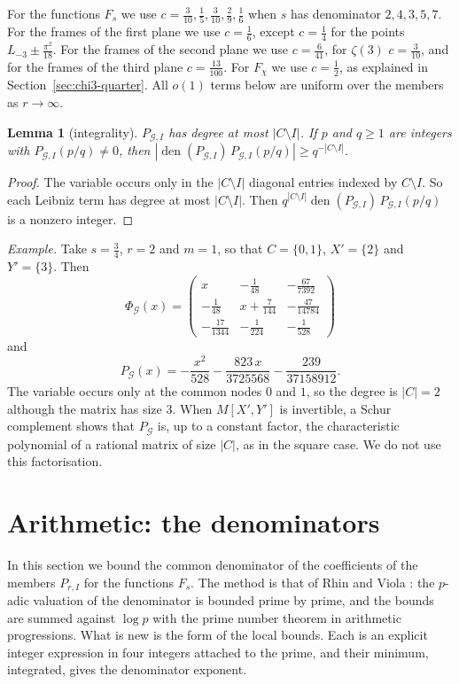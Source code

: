 \documentclass[11pt]{amsart}
\newtheorem{lemma}[theorem]{Lemma}
\theoremstyle{definition}
\theoremstyle{remark}
\numberwithin{equation}{section}
\newcommand{\den}{\operatorname{den}}
\newcommand{\Lt}{L_{-3}}             %
\begin{document}
For the functions $F_s$ we use $c=\frac3{10},\frac15,\frac3{10},\frac29,\frac16$ when $s$ has denominator
$2,4,3,5,7$. For the frames of the first plane we use $c=\frac16$, except $c=\frac14$ for the points
$\Lt\pm\frac{\pi^2}{18}$. For the frames of the second plane we use $c=\frac6{41}$, for $\zeta(3)$ $c=\frac3{10}$, and for
the frames of the third plane $c=\frac{13}{100}$. For $F_\chi$ we use
$c=\frac12$, as explained in Section~\ref{sec:chi3-quarter}. All $o(1)$ terms below are uniform over the members as
$r\to\infty$.

\begin{lemma}[integrality]\label{lem:integrality}
$P_{\mathcal G,I}$ has degree at most $|C\setminus I|$. If $p$ and $q\ge1$ are integers with
$P_{\mathcal G,I}(p/q)\ne0$, then $|\den(P_{\mathcal G,I})\,P_{\mathcal G,I}(p/q)|\ge q^{-|C\setminus I|}$.
\end{lemma}
\begin{proof}
The variable occurs only in the $|C\setminus I|$ diagonal entries indexed by $C\setminus I$. So each Leibniz term has
degree at most $|C\setminus I|$. Then $q^{|C\setminus I|}\den(P_{\mathcal G,I})\,P_{\mathcal G,I}(p/q)$ is a nonzero
integer.
\end{proof}

\emph{Example.} Take $s=\frac34$, $r=2$ and $m=1$, so that $C=\{0,1\}$, $X'=\{2\}$ and $Y'=\{3\}$. Then
\[
 \Phi_{\mathcal G}(x)=\begin{pmatrix}
 x & -\frac1{48} & -\frac{67}{7392}\\[2pt]
 -\frac1{48} & x+\frac7{144} & -\frac{47}{14784}\\[2pt]
 -\frac{17}{1344} & -\frac1{224} & -\frac1{528}
 \end{pmatrix}
\]
and
\[
 P_{\mathcal G}(x)=-\frac{x^2}{528}-\frac{823\,x}{3725568}-\frac{239}{37158912}.
\]
The variable occurs only at the common nodes $0$ and $1$, so the degree is $|C|=2$ although the matrix has size $3$. When $M[X',Y']$ is invertible, a Schur complement shows that $P_{\mathcal G}$
is, up to a constant factor, the characteristic polynomial of a rational matrix of size $|C|$, as in the square case.
We do not use this factorisation.

\section{Arithmetic: the denominators}\label{sec:content}

In this section we bound the common denominator of the coefficients of the members $P_{r,I}$ for the functions $F_s$.
The method is that of Rhin and Viola \cite{RhinViola96,RhinViola01}: the $p$-adic valuation of the denominator is bounded
prime by prime, and the bounds are summed against $\log p$ with the prime number theorem in arithmetic progressions.
What is new is the form of the local bounds. Each is an explicit integer expression in four integers attached to the
prime, and their minimum, integrated, gives the denominator exponent.
\end{document}
